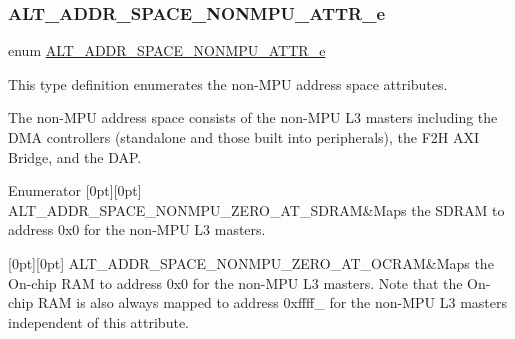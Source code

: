 \subsubsection{\texorpdfstring{ALT\_ADDR\_SPACE\_NONMPU\_ATTR\_e}{ALT\_ADDR\_SPACE\_NONMPU\_ATTR\_e}}
{\footnotesize\ttfamily enum \mbox{\hyperlink{group__ADDR__SPACE__MGR__REMAP_gae7413407ef45e9954d426e6e73a75463}{A\+L\+T\+\_\+\+A\+D\+D\+R\+\_\+\+S\+P\+A\+C\+E\+\_\+\+N\+O\+N\+M\+P\+U\+\_\+\+A\+T\+T\+R\+\_\+e}}}

This type definition enumerates the non-\/\+M\+PU address space attributes.

The non-\/\+M\+PU address space consists of the non-\/\+M\+PU L3 masters including the D\+MA controllers (standalone and those built into peripherals), the F2H A\+XI Bridge, and the D\+AP. \begin{DoxyEnumFields}{Enumerator}
[0pt][0pt]{}\mbox{\label{group__ADDR__SPACE__MGR__REMAP_ggae7413407ef45e9954d426e6e73a75463a7ca2d5a995bec6dcbfb71fa4c890270d}} 
A\+L\+T\+\_\+\+A\+D\+D\+R\+\_\+\+S\+P\+A\+C\+E\+\_\+\+N\+O\+N\+M\+P\+U\+\_\+\+Z\+E\+R\+O\+\_\+\+A\+T\+\_\+\+S\+D\+R\+AM&Maps the S\+D\+R\+AM to address 0x0 for the non-\/\+M\+PU L3 masters. \\
\hline

[0pt][0pt]{}\mbox{\label{group__ADDR__SPACE__MGR__REMAP_ggae7413407ef45e9954d426e6e73a75463a23e283c9a0c53a84037261bf23c1bf65}} 
A\+L\+T\+\_\+\+A\+D\+D\+R\+\_\+\+S\+P\+A\+C\+E\+\_\+\+N\+O\+N\+M\+P\+U\+\_\+\+Z\+E\+R\+O\+\_\+\+A\+T\+\_\+\+O\+C\+R\+AM&Maps the On-\/chip R\+AM to address 0x0 for the non-\/\+M\+PU L3 masters. Note that the On-\/chip R\+AM is also always mapped to address 0xffff\+\_ for the non-\/\+M\+PU L3 masters independent of this attribute. \\
\hline

\end{DoxyEnumFields}


